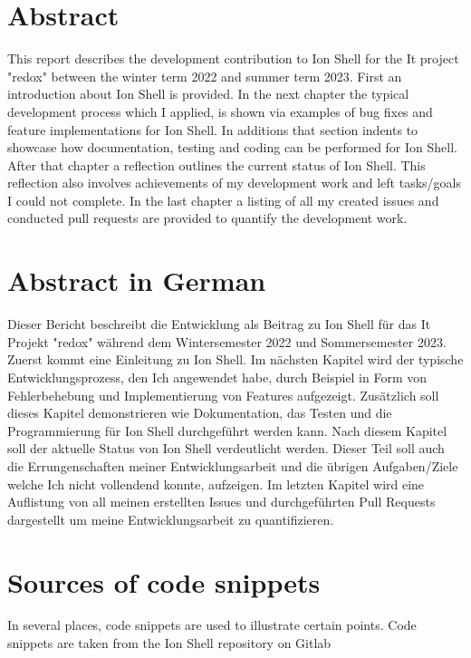\thispagestyle{empty}

\section{Abstract}

This report describes the development contribution to Ion Shell for the It project "redox"
between the winter term 2022 and summer term 2023.
First an introduction about Ion Shell is provided.
In the next chapter the typical development process which I applied, is shown
via examples of bug fixes and feature implementations for Ion Shell.
In additions that section indents to showcase how documentation, testing and coding can be performed for Ion Shell.
After that chapter a reflection outlines the current status of Ion Shell.
This reflection also involves achievements of my development work and left tasks/goals I could not complete.
In the last chapter a listing of all my created issues and conducted pull requests are provided to quantify the development work.

\section{Abstract in German}

Dieser Bericht beschreibt die Entwicklung als Beitrag zu Ion Shell für das It Projekt "redox"
während dem Wintersemester 2022 und Sommersemester 2023.
Zuerst kommt eine Einleitung zu Ion Shell.
Im nächsten Kapitel wird der typische Entwicklungsprozess, den Ich angewendet habe,
durch Beispiel in Form von Fehlerbehebung und Implementierung von Features aufgezeigt.
Zusätzlich soll dieses Kapitel demonstrieren wie Dokumentation, das Testen und die Programmierung für Ion Shell durchgeführt werden kann.
Nach diesem Kapitel soll der aktuelle Status von Ion Shell verdeutlicht werden.
Dieser Teil soll auch die Errungenschaften meiner Entwicklungsarbeit und die übrigen Aufgaben/Ziele welche Ich nicht vollendend konnte, aufzeigen.
Im letzten Kapitel wird eine Auflistung von all meinen erstellten Issues und durchgeführten Pull Requests dargestellt um
meine Entwicklungsarbeit zu quantifizieren.

\clearpage

\section{Sources of code snippets}

In several places, code snippets are used to illustrate certain points.
Code snippets are taken from the Ion Shell repository on Gitlab \cite{link_repos_ion_shell}

